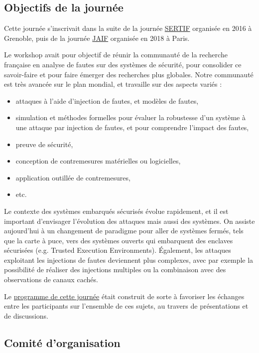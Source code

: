 \documentclass[a4paper,11pt]{article}
\begin{document}
\subsection{Objectifs de la journée}
\label{sec:org87f9805}

Cette journée s’inscrivait dans la suite de la journée \href{https://lazart.gricad-pages.univ-grenoble-alpes.fr/sertif/pages/workshop.html}{SERTIF} organisée
en 2016 à Grenoble,
puis de la journée \href{https://wp-systeme.lip6.fr/jaif}{JAIF} organisée en 2018 à Paris.

Le workshop avait pour objectif de réunir la communauté de la
recherche française en analyse de fautes sur des systèmes de sécurité,
pour consolider ce savoir-faire et pour faire émerger des recherches
plus globales.  Notre communauté est très avancée sur le plan mondial,
et travaille sur des aspects variés :

\begin{itemize}
\item attaques à l'aide d'injection de fautes, et modèles de fautes,
\item simulation et méthodes formelles pour évaluer la robustesse d'un
système à une attaque par injection de fautes, et pour comprendre
l’impact des fautes,
\item preuve de sécurité,
\item conception de contremesures matérielles ou logicielles,
\item application outillée de contremesures,
\item etc.
\end{itemize}

Le contexte des systèmes embarqués sécurisés évolue
rapidement, et il est important d’envisager l’évolution des
attaques mais aussi des systèmes.
On assiste aujourd’hui à un changement de paradigme pour aller de
systèmes fermés, tels que la carte à puce, vers des systèmes ouverts qui
embarquent des enclaves sécurisées (e.g. Trusted Execution
Environments).  Également, les attaques exploitant les injections de
fautes deviennent plus complexes, avec par exemple la possibilité de
réaliser des injections multiples ou la combinaison avec des
observations de canaux cachés.

Le \href{./programme.html}{programme de cette journée} était construit de sorte à favoriser les
échanges entre les participants sur l’ensemble de ces sujets, au
travers de présentations et de discussions.

\subsection{Comité d'organisation}
\label{sec:org3820342}
\end{document}
